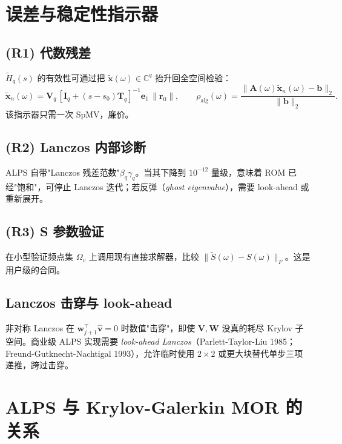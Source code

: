 \documentclass[11pt,a4paper]{ctexart}
\newcommand{\C}{\mathbb{C}}
\begin{document}
\section{误差与稳定性指示器}\label{sec:residual}

\subsection{(R1) 代数残差}
$\widetilde H_q(s)$ 的有效性可通过把 $\widetilde{\bm x}(\omega)\in\C^q$ 抬升回全空间检验：
\begin{equation}
  \widetilde{\bm x}_n(\omega) = \bm V_q\,[\bm I_q + (s-s_0)\bm T_q]^{-1}\bm e_1\,\|\bm r_0\|,\qquad
  \rho_{\mathrm{alg}}(\omega) = \frac{\|\bm A(\omega)\widetilde{\bm x}_n(\omega) - \bm b\|_2}{\|\bm b\|_2}.
\end{equation}
该指示器只需一次 SpMV，廉价。

\subsection{(R2) Lanczos 内部诊断}
ALPS 自带"Lanczos 残差范数"$\beta_q\gamma_q$。当其下降到 $10^{-12}$ 量级，意味着 ROM 已经"饱和"，可停止 Lanczos 迭代；若反弹（\emph{ghost eigenvalue}），需要 look-ahead 或重新展开。

\subsection{(R3) S 参数验证}
在小型验证频点集 $\Omega_v$ 上调用现有直接求解器，比较 $\|\widetilde S(\omega)-S(\omega)\|_F$。这是用户级的合同。

\subsection{Lanczos 击穿与 look-ahead}

非对称 Lanczos 在 $\bm w_{j+1}^{\!\top}\hat{\bm v} = 0$ 时数值"击穿"，即使 $\bm V,\bm W$ 没真的耗尽 Krylov 子空间。商业级 ALPS 实现需要 \emph{look-ahead Lanczos}（Parlett-Taylor-Liu 1985；Freund-Gutknecht-Nachtigal 1993），允许临时使用 $2\times 2$ 或更大块替代单步三项递推，跨过击穿。

\section{ALPS 与 Krylov-Galerkin MOR 的关系}\label{sec:vs-mor}
\end{document}

